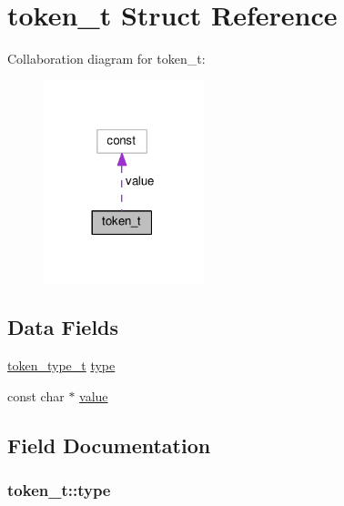 \hypertarget{structtoken__t}{}\section{token\+\_\+t Struct Reference}
\label{structtoken__t}


Collaboration diagram for token\+\_\+t\+:
\nopagebreak
\begin{figure}[H]
\begin{center}
\leavevmode
\includegraphics[width=132pt]{structtoken__t__coll__graph}
\end{center}
\end{figure}
\subsection*{Data Fields}
\begin{DoxyCompactItemize}
\item 
\hyperlink{mod__include_8c_ad04fc3241884cc3eb19ccad1ce5afa69}{token\+\_\+type\+\_\+t} \hyperlink{structtoken__t_aaf2d4e06bb9cf70c210b67e529423c41}{type}
\item 
const char $\ast$ \hyperlink{structtoken__t_a1de7b234da1e01241f78e3e9da953198}{value}
\end{DoxyCompactItemize}


\subsection{Field Documentation}
\subsubsection[{\texorpdfstring{type}{type}}]{ token\+\_\+t\+::type}\hypertarget{structtoken__t_aaf2d4e06bb9cf70c210b67e529423c41}{}\label{structtoken__t_aaf2d4e06bb9cf70c210b67e529423c41}
